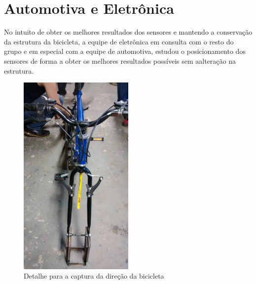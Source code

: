 
\section{Automotiva e Eletrônica} %
\label{sec:automotiva_e_eletr_nica}

No intuito de obter os melhores resultados dos sensores e mantendo a conservação da estrutura da bicicleta, a equipe de eletrônica em consulta com o resto do grupo e em especial com a equipe de automotiva, estudou o posicionamento dos sensores de forma a obter os melhores resultados  possíveis sem aalteração na estrutura.


\begin{figure}[h]
  \centering
	\includegraphics[width=0.5\textwidth]{figuras/experimentos/IMG-20141128-WA0013}
  \caption{Detalhe para a captura da direção da bicicleta}
  \label{fig:figuras_experimentos_img_20141128_wa0013}
\end{figure}

